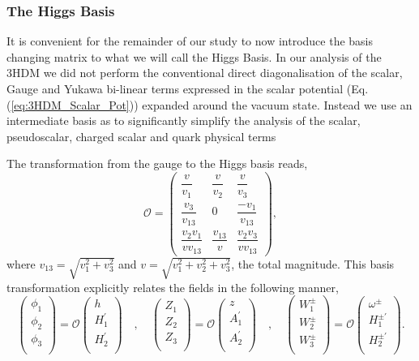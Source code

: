 \documentclass[10pt]{report}
\begin{document}
\subsubsection{The Higgs Basis}

It is convenient for the remainder of our study to now introduce the basis changing matrix to what we will call the Higgs Basis. In our analysis of the 3HDM we did not perform the conventional direct diagonalisation of the scalar, Gauge and Yukawa bi-linear terms expressed in the scalar potential (Eq.\,(\ref{eq:3HDM_Scalar_Pot})) expanded around the vacuum state. Instead we use an intermediate basis as to significantly simplify the analysis of the scalar, pseudoscalar, charged scalar and quark physical terms 

The transformation from the gauge to the Higgs basis reads, 
\begin{equation}
\mathcal{O} = 
\begin{pmatrix}
\dfrac{v}{v_1} & \dfrac{v}{v_2}  & \dfrac{v}{v_3} \\[1.2em]
\dfrac{v_3}{v_{13}} & 0 & \dfrac{-v_1}{v_{13}} \\[1.2em]
\dfrac{v_2 v_1}{v v_{13}}  & \dfrac{v_{13}}{v} & \dfrac{v_2 v_3}{v v_{13}}  
\end{pmatrix} , 
\end{equation}
%
where $v_{13}=\sqrt{v_1^2 + v_3^2}$ and $v=\sqrt{v_1^2 + v_2^2 + v_3^2 }$, the total magnitude. This basis transformation explicitly relates the fields in the following manner, 
%
\begin{equation}
\begin{pmatrix}
\phi_1 \\
\phi_2 \\
\phi_3 \\
\end{pmatrix} = 
\mathcal{O} \begin{pmatrix}
h \\
H_1^\prime \\
H_2^\prime \\
\end{pmatrix} 
%
\quad , \quad 
%
\begin{pmatrix}
Z_1 \\
Z_2 \\
Z_3 \\
\end{pmatrix} = 
\mathcal{O} \begin{pmatrix}
z \\
A_1^\prime  \\
A_2^\prime  \\
\end{pmatrix} 
%
\quad , \quad 
%
\begin{pmatrix}
W_1^\pm  \\
W_2^\pm  \\
W_3^\pm  \\
\end{pmatrix} = 
\mathcal{O} \begin{pmatrix}
\omega^\pm \\
H_1^{\pm \prime}  \\
H_2^{\pm \prime}  \\
\end{pmatrix} . 
\end{equation}
\end{document}
